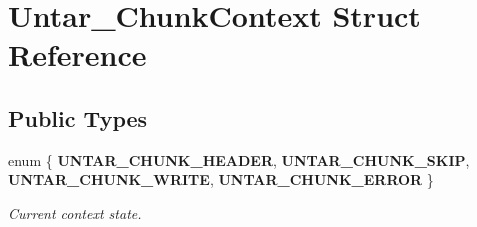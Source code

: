 \hypertarget{structUntar__ChunkContext}{}\section{Untar\+\_\+\+Chunk\+Context Struct Reference}
\label{structUntar__ChunkContext}
\subsection*{Public Types}
\begin{DoxyCompactItemize}
\item 
\mbox{\label{structUntar__ChunkContext_aa1f86cb1b0c749ec2d99b13fa447993d}} 
enum \{ {\bfseries U\+N\+T\+A\+R\+\_\+\+C\+H\+U\+N\+K\+\_\+\+H\+E\+A\+D\+ER}, 
{\bfseries U\+N\+T\+A\+R\+\_\+\+C\+H\+U\+N\+K\+\_\+\+S\+K\+IP}, 
{\bfseries U\+N\+T\+A\+R\+\_\+\+C\+H\+U\+N\+K\+\_\+\+W\+R\+I\+TE}, 
{\bfseries U\+N\+T\+A\+R\+\_\+\+C\+H\+U\+N\+K\+\_\+\+E\+R\+R\+OR}
 \}
\begin{DoxyCompactList}\small\item\em Current context state. \end{DoxyCompactList}\end{DoxyCompactItemize}
